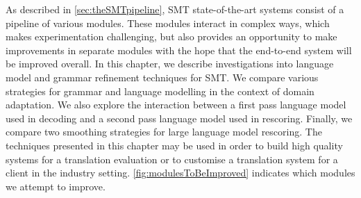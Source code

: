 As described in \autoref{sec:theSMTpipeline}, SMT state-of-the-art
systems consist of a pipeline of various modules. These modules
interact in complex ways, which makes experimentation challenging, but
also provides an opportunity to make improvements in separate modules with
the hope that the end-to-end system will be improved overall.
In this chapter, we describe investigations into language model
and grammar refinement techniques for SMT. We compare various strategies for grammar
and language modelling in the context of domain adaptation. We also explore
the interaction between a first pass language model used in decoding and a second
pass language model used in rescoring. Finally, we compare two smoothing
strategies for large language model rescoring.
The techniques presented in this chapter may be used in order
to build high quality systems for a
translation evaluation or to customise a translation system
for a client in the industry setting.
\autoref{fig:modulesToBeImproved} indicates which modules we attempt
to improve.
%
